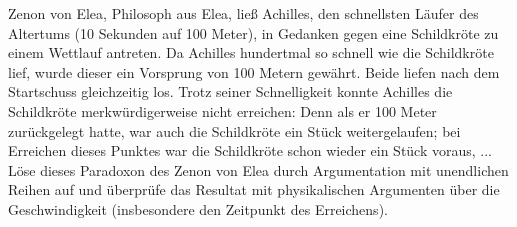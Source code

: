 \begin{exercise}
  Zenon von Elea, Philosoph aus Elea, ließ Achilles, den schnellsten Läufer des
  Altertums (10 Sekunden auf 100 Meter), in Gedanken gegen eine Schildkröte zu
  einem Wettlauf antreten. Da Achilles hundertmal so schnell wie die Schildkröte
  lief, wurde dieser ein Vorsprung von 100 Metern gewährt. Beide liefen nach dem
  Startschuss gleichzeitig los. Trotz seiner Schnelligkeit konnte Achilles die
  Schildkröte merkwürdigerweise nicht erreichen: Denn als er 100 Meter
  zurückgelegt hatte, war auch die Schildkröte ein Stück weitergelaufen; bei
  Erreichen dieses Punktes war die Schildkröte schon wieder ein Stück voraus,
  ...\\
  Löse dieses Paradoxon des Zenon von Elea durch Argumentation mit unendlichen
  Reihen auf und überprüfe das Resultat mit physikalischen Argumenten über die
  Geschwindigkeit (insbesondere den Zeitpunkt des Erreichens).
\end{exercise}
